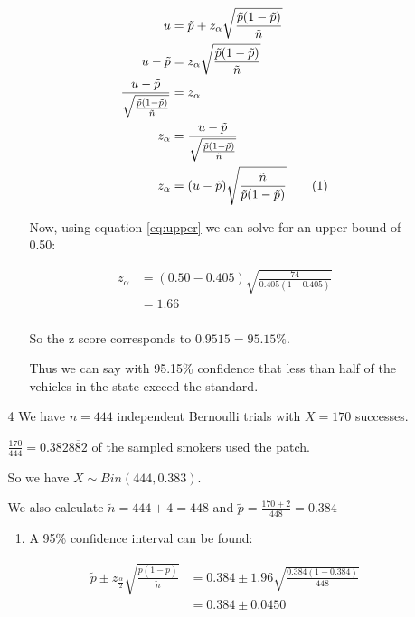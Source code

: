 \documentclass[12pt,letterpaper]{article}
\newcommand\numberthis{\refstepcounter{equation}\tag{\theequation}}
\begin{document}
\begin{enumerate}
\begin{enumerate}
\begin{enumerate}[label=(\arabic*)]
              \begin{align*}
                u &= \tilde{p} + z_\alpha \sqrt{\frac{\tilde{p}(1 - \tilde{p})}{\tilde{n}}} \\
                u - \tilde{p} &= z_\alpha \sqrt{\frac{\tilde{p}(1 - \tilde{p})}{\tilde{n}}} \\
                \frac{u - \tilde{p}}{\sqrt{\frac{\tilde{p}(1 - \tilde{p})}{\tilde{n}}}} &= z_\alpha \\
                z_\alpha &= \frac{u - \tilde{p}}{\sqrt{\frac{\tilde{p}(1 - \tilde{p})}{\tilde{n}}}} \\
                z_\alpha &= (u - \tilde{p})\sqrt{\frac{\tilde{n}}{\tilde{p}(1 - \tilde{p})}} \numberthis \label{eq:upper} \\
              \end{align*}

              Now, using equation \ref{eq:upper} we can solve for an upper bound of 0.50:

              \begin{align*}
                z_\alpha &= (0.50 - 0.405)\sqrt{\frac{74}{0.405(1 - 0.405)}} \\
                &= 1.66 \\
              \end{align*}

              So the z score corresponds to $0.9515 = 95.15\%$.

              Thus we can say with 95.15\% confidence that less than half of the vehicles in the state exceed the standard.
          \end{enumerate}
        \item [4]
          We have $n = 444$ independent Bernoulli trials with $X = 170$ successes.

          $\frac{170}{444} = 0.382\overline{882}$ of the sampled smokers used the patch.

          So we have $X \sim Bin(444, 0.383)$.

          We also calculate $\tilde{n} = 444 + 4 = 448$ and
          $\tilde{p} = \frac{170 + 2}{448} = 0.384$
          \begin{enumerate}[label=(\arabic*)]
            \item
              A 95\% confidence interval can be found:

              \begin{align*}
                \tilde{p} \pm z_{\frac{\alpha}{2}} \sqrt{\frac{\tilde{p}(1 - \tilde{p})}{\tilde{n}}}
                &= 0.384 \pm 1.96 \sqrt{\frac{0.384(1 - 0.384)}{448}} \\
                &= 0.384 \pm 0.0450 \\
              \end{align*}


\end{enumerate}
\end{enumerate}
\end{enumerate}
\end{document}
